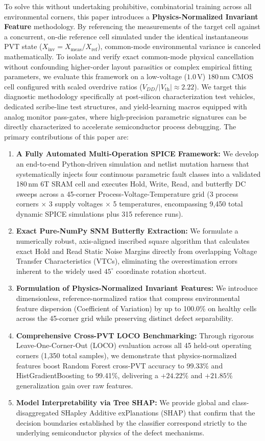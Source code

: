\documentclass[conference]{IEEEtran}
\begin{document}
To solve this without undertaking prohibitive, combinatorial training across all environmental corners, this paper introduces a \textbf{Physics-Normalized Invariant Feature} methodology. By referencing the measurements of the target cell against a concurrent, on-die reference cell simulated under the identical instantaneous PVT state ($X_{\text{inv}} = X_{\text{meas}} / X_{\text{ref}}$), common-mode environmental variance is canceled mathematically. To isolate and verify exact common-mode physical cancellation without confounding higher-order layout parasitics or complex empirical fitting parameters, we evaluate this framework on a low-voltage ($1.0\,\text{V}$) $180\,\text{nm}$ CMOS cell configured with scaled overdrive ratios ($V_{DD}/|V_{\text{th}}| \approx 2.22$). We target this diagnostic methodology specifically at post-silicon characterization test vehicles, dedicated scribe-line test structures, and yield-learning macros equipped with analog monitor pass-gates, where high-precision parametric signatures can be directly characterized to accelerate semiconductor process debugging. The primary contributions of this paper are:
\begin{enumerate}
    \item \textbf{A Fully Automated Multi-Operation SPICE Framework:} We develop an end-to-end Python-driven simulation and netlist mutation harness that systematically injects four continuous parametric fault classes into a validated 180\,nm 6T SRAM cell and executes Hold, Write, Read, and butterfly DC sweeps across a 45-corner Process-Voltage-Temperature grid (3 process corners $\times$ 3 supply voltages $\times$ 5 temperatures, encompassing 9,450 total dynamic SPICE simulations plus 315 reference runs).
    \item \textbf{Exact Pure-NumPy SNM Butterfly Extraction:} We formulate a numerically robust, axis-aligned inscribed square algorithm that calculates exact Hold and Read Static Noise Margins directly from overlapping Voltage Transfer Characteristics (VTCs), eliminating the overestimation errors inherent to the widely used $45^\circ$ coordinate rotation shortcut.
    \item \textbf{Formulation of Physics-Normalized Invariant Features:} We introduce dimensionless, reference-normalized ratios that compress environmental feature dispersion (Coefficient of Variation) by up to 100.0\% on healthy cells across the 45-corner grid while preserving distinct defect separability.
    \item \textbf{Comprehensive Cross-PVT LOCO Benchmarking:} Through rigorous Leave-One-Corner-Out (LOCO) evaluation across all 45 held-out operating corners (1,350 total samples), we demonstrate that physics-normalized features boost Random Forest cross-PVT accuracy to 99.33\% and HistGradientBoosting to 99.41\%, delivering a $+24.22\%$ and $+21.85\%$ generalization gain over raw features.
    \item \textbf{Model Interpretability via Tree SHAP:} We provide global and class-disaggregated SHapley Additive exPlanations (SHAP) that confirm that the decision boundaries established by the classifier correspond strictly to the underlying semiconductor physics of the defect mechanisms.
\end{enumerate}
\end{document}
